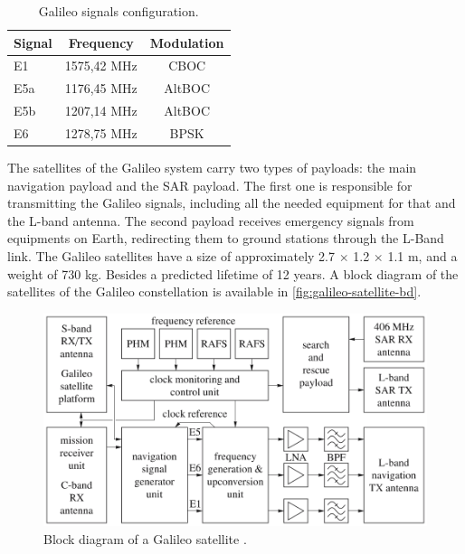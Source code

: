 \begin{table}[!ht]
    \centering
    \begin{tabular}{lcc}
        \toprule[1.5pt]
        \textbf{Signal} & \textbf{Frequency} & \textbf{Modulation} \\
        \midrule
        E1  & 1575,42 MHz & CBOC \\
        E5a & 1176,45 MHz & AltBOC \\
        E5b & 1207,14 MHz & AltBOC \\
        E6  & 1278,75 MHz & BPSK \\
        \bottomrule[1.5pt]
    \end{tabular}
    \caption{Galileo signals configuration.}
    \label{tab:galileo-signals}
\end{table}


The satellites of the Galileo system carry two types of payloads: the main navigation payload and the SAR payload. The first one is responsible for transmitting the Galileo signals, including all the needed equipment for that and the L-band antenna. The second payload receives emergency signals from equipments on Earth, redirecting them to ground stations through the L-Band link. The Galileo satellites have a size of approximately 2.7 $\times$ 1.2 $\times$ 1.1 m, and a weight of 730 kg. Besides a predicted lifetime of 12 years. A block diagram of the satellites of the Galileo constellation is available in \autoref{fig:galileo-satellite-bd}.

\begin{figure}[!ht]
    \begin{center}
        \includegraphics[width=\columnwidth]{figures/galileo-satellite-bd}
        \caption{Block diagram of a Galileo satellite \cite{hofmann-wellenhof2007}.}
        \label{fig:galileo-satellite-bd}
    \end{center}
\end{figure}

